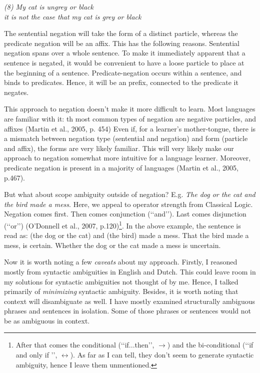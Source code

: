 \begin{center}
	{\it (8) My cat is ungrey or black\\ it is not the case that my cat is grey or black}
\end{center}


\noindent The sentential negation will take the form of a distinct particle, whereas the predicate negation will be an affix. This has the following reasons. Sentential negation spans over a whole sentence. To make it immediately apparent that a sentence is negated, it would be convenient to have a loose particle to place at the beginning of a sentence. Predicate-negation occurs within a sentence, and binds to predicates. Hence, it will be an prefix, connected to the predicate it negates.  

This approach to negation doesn't make it more difficult to learn. Most languages are familiar with it: th most common types of negation are negative particles, and affixes (Martin et al., 2005, p. 454) Even if, for a learner's mother-tongue, there is a mismatch between negation type (sentential and negation) and form (particle and affix), the forms are very likely familiar. This will very likely make our approach to negation somewhat more intuitive for a language learner. Moreover, predicate negation is present in a majority of languages (Martin et al., 2005, p.467).

But what about scope ambiguity outside of negation? E.g. {\it The dog or the cat and the bird made a mess}. Here, we appeal to operator strength from Classical Logic. Negation comes first. Then comes conjunction (\lq\lq and\rq\rq). Last comes disjunction (\lq\lq or\rq\rq) (O'Donnell et al., 2007, p.120)\footnote{After that comes the conditional (\lq\lq if...then\rq\rq, $\rightarrow$) and the bi-conditional (\lq\lq if and only if \rq\rq, $\leftrightarrow$). As far as I can tell, they don't seem to generate syntactic ambiguity, hence I leave them unmentioned.}. In the above example, the sentence is read as: (the dog or the cat) and (the bird) made a mess. That the bird made a mess, is certain. Whether the dog or the cat made a mess is uncertain.



Now it is worth noting a few {\it caveats} about my approach. Firstly, I reasoned mostly from syntactic ambiguities in English and Dutch. This could leave room in my solutions for syntactic ambiguities not thought of by me. Hence, I talked primarily of {\it minimizing} syntactic ambiguity. Besides, it is worth noting that context will disambiguate as well. I have mostly examined structurally ambiguous phrases and sentences in isolation. Some of those phrases or sentences would not be as ambiguous in context.  


